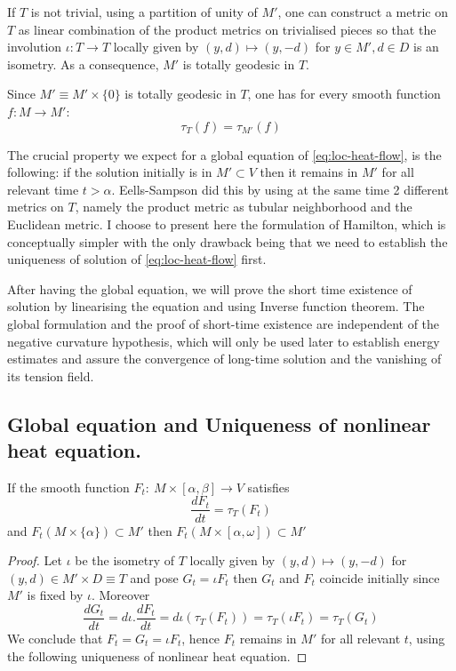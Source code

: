 If \(T\) is not trivial, using a partition of unity of \(M'\), one can construct a metric on \(T\)
as linear combination of the product metrics on trivialised pieces so that
the involution \(\iota: T \longrightarrow T\) locally given by \((y,d)\mapsto (y,-d)\)
for \(y\in M', d\in D\) is an isometry. As a consequence, \(M'\) is totally geodesic
in \(T\).


Since \(M' \equiv M'\times \{0\}\) is totally geodesic in \(T\), one has for every smooth
function \(f: M \longrightarrow M'\):
\[
 \tau_T(f) = \tau_{M'} (f)
\]

The crucial property we expect for a global equation of \eqref{eq:loc-heat-flow}, is the following: if
the solution initially is in \(M'\subset V\) then it remains in \(M'\) for all
relevant time \(t>\alpha\). Eells-Sampson \cite{eells_harmonic_1964} did this by using at
the same time 2 different metrics on \(T\), namely the product metric as tubular
neighborhood and the Euclidean metric. I choose to present here the formulation of
Hamilton, which is conceptually simpler with the only drawback being that we need to
establish the uniqueness of solution of \eqref{eq:loc-heat-flow} first.

After having the global equation, we will prove the short time existence of solution by
linearising the equation and using Inverse function theorem. The global formulation and the
proof of short-time existence are independent of the negative curvature hypothesis, which
will only be used later to establish energy estimates and assure the convergence of
long-time solution and the vanishing of its tension field.


\subsection{Global equation and Uniqueness of nonlinear heat equation.}
\label{sec:org0c7b7c2}
\begin{theorem}
\label{thm:global-eq}
If the smooth function \(F_t:\ M\times [\alpha,\beta] \longrightarrow V\) satisfies
\begin{equation}
\label{eq:global-heat}
\frac{d F_t}{dt} = \tau_T(F_t)
\end{equation}
and \(F_t(M\times \{\alpha\}) \subset M'\) then \(F_t(M\times[\alpha,\omega])\subset M'\)
\end{theorem}
\begin{proof}
Let \(\iota\) be the isometry of \(T\) locally given by \((y,d)\mapsto (y,-d)\) for \((y,d)\in M'\times D \equiv T\) 
and pose \(G_t= \iota F_t\) then \(G_t\) and \(F_t\) coincide initially since \(M'\) is
fixed by \(\iota\). Moreover
\[
\frac{d G_t}{d t} = d\iota . \frac{d F_t}{d t} = d\iota (\tau_T(F_t)) = \tau_T(\iota F_t)=\tau_T(G_t)
\]
We conclude that \(F_t = G_t = \iota F_t\), hence \(F_t\) remains in \(M'\) for all
relevant \(t\), using the following uniqueness of nonlinear heat equation.
\end{proof}

